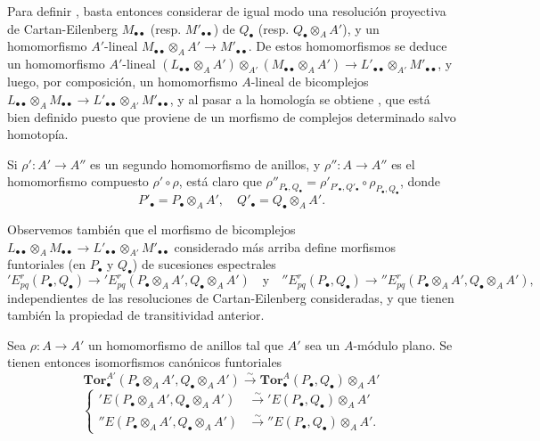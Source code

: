 \begin{env}[6.3.8]
Para definir , basta entonces considerar de igual modo una
resolución proyectiva de Cartan-Eilenberg $M_{\bullet\bullet}$ (resp.
$M'_{\bullet\bullet}$) de $Q_\bullet$ (resp.
$Q_\bullet\otimes_A A'$), y un homomorfismo $A'$-lineal
$M_{\bullet\bullet}\otimes_A A'\to M'_{\bullet\bullet}$. De estos
homomorfismos se deduce un homomorfismo $A'$-lineal
$(L_{\bullet\bullet}\otimes_A A')\otimes_{A'}
(M_{\bullet\bullet}\otimes_A A')
\to
L'_{\bullet\bullet}\otimes_{A'}M'_{\bullet\bullet}$,
y luego, por composición, un homomorfismo $A$-lineal de bicomplejos
$L_{\bullet\bullet}\otimes_A M_{\bullet\bullet}
\to
L'_{\bullet\bullet}\otimes_{A'}M'_{\bullet\bullet}$,
y al pasar a la homología se obtiene , que está bien
definido
puesto que proviene de un morfismo de complejos determinado salvo homotopía.

Si $\rho':A'\to A''$ es un segundo homomorfismo de anillos, y
$\rho'':A\to A''$ es el homomorfismo compuesto $\rho'\circ\rho$, está claro que
$\rho''_{P_\bullet,Q_\bullet}
=\rho'_{P'_\bullet,Q'_\bullet}\circ\rho_{P_\bullet,Q_\bullet}$, donde
\[
  P'_\bullet=P_\bullet\otimes_A A',
  \quad Q'_\bullet=Q_\bullet\otimes_A A'.
\]

Observemos también que el morfismo de bicomplejos
$L_{\bullet\bullet}\otimes_A M_{\bullet\bullet}
\to L'_{\bullet\bullet}\otimes_{A'}M'_{\bullet\bullet}$ considerado
más arriba define morfismos funtoriales (en $P_\bullet$ y $Q_\bullet$)
de sucesiones espectrales
\[
  'E_{pq}^r(P_\bullet,Q_\bullet)
  \longrightarrow
  'E_{pq}^r(P_\bullet\otimes_A A',Q_\bullet\otimes_A A')
  \quad\text{y}\quad
  ''E_{pq}^r(P_\bullet,Q_\bullet)
  \longrightarrow
  ''E_{pq}^r(P_\bullet\otimes_A A',Q_\bullet\otimes_A A'),
\]
independientes de las resoluciones de Cartan-Eilenberg consideradas, y que tienen también
la propiedad de transitividad anterior.
\end{env}

\begin{proposition}[6.3.9]
\label{III.6.3.9}
Sea $\rho:A\to A'$ un homomorfismo de anillos tal que $A'$ sea un
$A$-módulo \textup{plano}. Se tienen entonces isomorfismos canónicos funtoriales
\[
  \mathbf{Tor}_\bullet^{A'}
  (P_\bullet\otimes_A A',Q_\bullet\otimes_A A')
  \xrightarrow{\sim}
  \mathbf{Tor}_\bullet^A(P_\bullet,Q_\bullet)\otimes_A A'
  \tag{6.3.9.1}\label{III.6.3.9.1.fr}
\]
\[
  \left\{
  \begin{aligned}
  'E(P_\bullet\otimes_A A',Q_\bullet\otimes_A A')
    &\xrightarrow{\sim}'E(P_\bullet,Q_\bullet)\otimes_A A'\\
  ''E(P_\bullet\otimes_A A',Q_\bullet\otimes_A A')
    &\xrightarrow{\sim}''E(P_\bullet,Q_\bullet)\otimes_A A'.
  \end{aligned}
  \right.
  \tag{6.3.9.2}\label{III.6.3.9.2.fr}
\]
\end{proposition}

